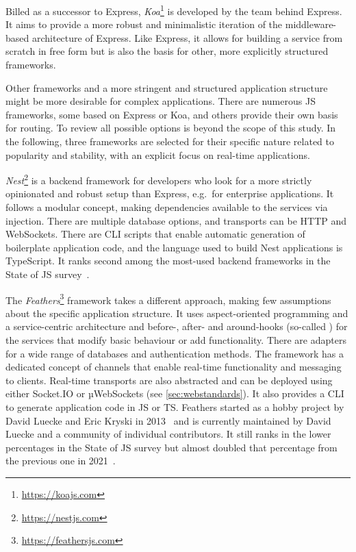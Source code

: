 Billed as a successor to Express, \emph{Koa}\footnote{\url{https://koajs.com}} is developed by the team behind Express.
It aims to provide a more robust and minimalistic iteration of the middleware-based architecture of Express.
Like Express, it allows for building a service from scratch in free form but is also the basis for other, more explicitly structured frameworks.

Other frameworks and a more stringent and structured application structure might be more desirable for complex applications.
There are numerous \ac{JS} frameworks, some based on Express or Koa, and others provide their own basis for routing.
To review all possible options is beyond the scope of this study.
In the following, three frameworks are selected for their specific nature related to popularity and stability, with an explicit focus on real-time applications.



\emph{Nest}\footnote{\url{https://nestjs.com}} is a backend framework for developers who look for a more strictly opinionated and robust setup than Express, e.g.\ for enterprise applications.
It follows a modular concept, making dependencies available to the services via injection.
There are multiple database options, and transports can be HTTP and WebSockets.
There are \ac{CLI} scripts that enable automatic generation of boilerplate application code, and the language used to build Nest applications is TypeScript.
It ranks second among the most-used backend frameworks in the State of JS survey~\parencite{mostUsedBackendFrameworks22}.

The \emph{Feathers}\footnote{\url{https://feathersjs.com}} framework takes a different approach, making few assumptions about the specific application structure.
It uses aspect-oriented programming and a service-centric architecture and before-, after- and around-hooks (so-called ) for the services that modify basic behaviour or add functionality.
There are adapters for a wide range of databases and authentication methods.
The framework has a dedicated concept of channels that enable real-time functionality and messaging to clients.
Real-time transports are also abstracted and can be deployed using either Socket.IO or µWebSockets (see \autoref{sec:webstandards}). It also provides a \ac{CLI} to generate application code in \ac{JS} or \ac{TS}.
Feathers started as a hobby project by David Luecke and Eric Kryski in 2013~\parencite{feathersFrameworkHistory} and is currently maintained by David Luecke and a community of individual contributors.
It still ranks in the lower percentages in the State of JS survey but almost doubled that percentage from the previous one in 2021~\parencite{mostUsedBackendFrameworks21}.


